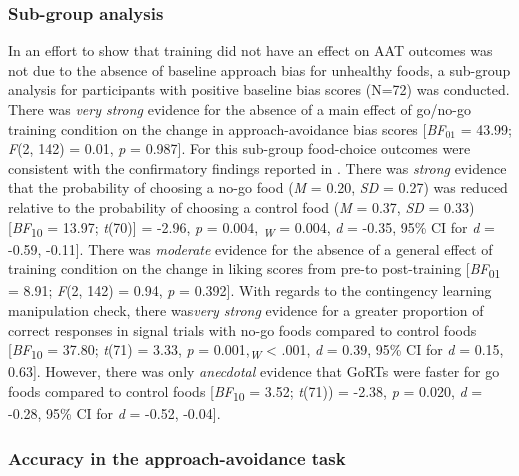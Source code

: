\documentclass[man,floatsintext]{apa6}
\begin{document}
\hypertarget{subgroup}{%
\subsubsection{Sub-group analysis}\label{subgroup}}

In an effort to show that training did not have an effect on AAT outcomes was not due to the absence of baseline approach bias for unhealthy foods, a sub-group analysis for participants with positive baseline bias scores (N=72) was conducted. There was \emph{very strong} evidence for the absence of a main effect of go/no-go training condition on the change in approach-avoidance bias scores {[}\emph{BF}\(_{01}\) = 43.99; \emph{F}(2, 142) = 0.01, \emph{p} = 0.987{]}. For this sub-group food-choice outcomes were consistent with the confirmatory findings reported in \textit{}. There was \emph{strong} evidence that the probability of choosing a no-go food (\emph{M} = 0.20, \emph{SD} = 0.27) was reduced relative to the probability of choosing a control food (\emph{M} = 0.37, \emph{SD} = 0.33) {[}\textit{BF}\textsubscript{10} = 13.97; \emph{t}(70){]} = -2.96, \emph{p} = 0.004, \textit{\textsubscript{W}} = 0.004, \emph{d} = -0.35, 95\% CI for \emph{d} = -0.59, -0.11{]}. There was \emph{moderate} evidence for the absence of a general effect of training condition on the change in liking scores from pre-to post-training {[}\emph{BF}\textsubscript{01} = 8.91; \emph{F}(2, 142) = 0.94, \emph{p} = 0.392{]}. With regards to the contingency learning manipulation check, there was\emph{very strong} evidence for a greater proportion of correct responses in signal trials with no-go foods compared to control foods {[}\emph{BF}\textsubscript{10} = 37.80; \emph{t}(71) = 3.33, \emph{p} = 0.001,\textit{\textsubscript{W}} \textless{} .001, \emph{d} = 0.39, 95\% CI for \emph{d} = 0.15, 0.63{]}. However, there was only \emph{anecdotal} evidence that GoRTs were faster for go foods compared to control foods {[}\emph{BF}\textsubscript{10} = 3.52; \emph{t}(71)) = -2.38, \emph{p} = 0.020, \emph{d} = -0.28, 95\% CI for \emph{d} = -0.52, -0.04{]}.

\hypertarget{accuracy_aat}{%
\subsubsection{Accuracy in the approach-avoidance task}\label{accuracy_aat}}

\par
\end{document}
